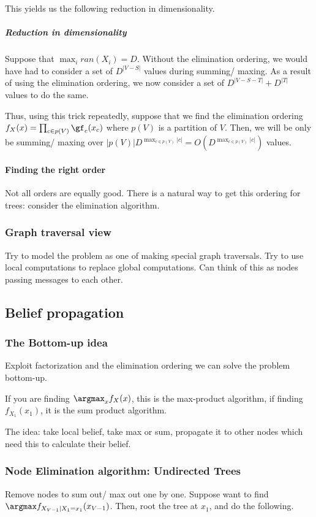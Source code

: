 \documentclass[oneside, article]{memoir}
\begin{document}
This yields us the following reduction in dimensionality.

\subparagraph*{Reduction in dimensionality}
Suppose that $\max_i ran(X_i) = D$. Without the elimination ordering, we would have had to consider a set of $D^{|V-S|}$ values during summing/ maxing. As a result of using the elimination ordering, we now consider a set of $D^{|V-S-T|} + D^{|T|}$ values to do the same.

Thus, using this trick repeatedly, suppose that we find the elimination ordering $f_X(x) = \prod_{c \in p(V)} \gf_c(x_c)$ where $p(V)$ is a partition of $V$. Then, we will be only be summing/ maxing over $|p(V)|D^{\max_{c \in p(V)} |c|} = O(D^{\max_{c \in p(V)} |c|})$ values.

\paragraph*{Finding the right order}
Not all orders are equally good. There is a natural way to get this ordering for trees: consider the elimination algorithm.

\subsubsection{Graph traversal view}
Try to model the problem as one of making special graph traversals. Try to use local computations to replace global computations. Can think of this as nodes passing messages to each other.

\subsection{Belief propagation}
\subsubsection{The Bottom-up idea}
Exploit factorization and the elimination ordering we can solve the problem bottom-up.

If you are finding $\argmax_x f_X(x)$, this is the max-product algorithm, if finding $f_{X_1}(x_1)$, it is the sum product algorithm.

The idea: take local belief, take max or sum, propagate it to other nodes which need this to calculate their belief.

\subsubsection{Node Elimination algorithm: Undirected Trees}
Remove nodes to sum out/ max out one by one. Suppose want to find\\ $\argmax f_{X_{V-1}|X_1 = x_1}(x_{V-1})$. Then, root the tree at $x_1$, and do the following.
\end{document}
